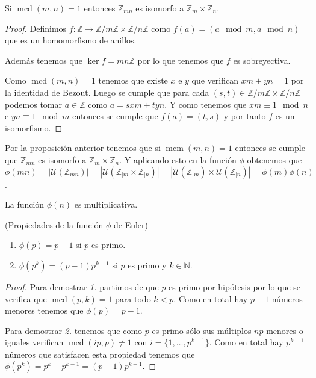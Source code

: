 \begin{proposicion}
		Si $\operatorname{mcd}(m,n)=1$ entonces $\mathbb{Z}_{mn}$ es isomorfo a $\mathbb{Z}_m\times\mathbb{Z}_n$.
\end{proposicion}
\begin{proof}
		Definimos $f:\mathbb{Z}\rightarrow\mathbb{Z}/m\mathbb{Z}\times\mathbb{Z}/n\mathbb{Z}$ como $f(a)=(a\mod m, a\mod n)$ que es un homomorfismo de anillos.

		Además tenemos que $\ker f=mn\mathbb{Z}$ por lo que tenemos que $f$ es sobreyectiva.
		
		Como $\operatorname{mcd}(m,n) = 1$ tenemos que existe $x$ e $y$ que verifican $xm+yn=1$ por la identidad de Bezout. Luego se cumple que para cada $(s,t)\in \mathbb{Z}/m\mathbb{Z}\times\mathbb{Z}/n\mathbb{Z}$ podemos tomar $a \in \mathbb{Z}$ como $a=sxm+tyn$. Y como tenemos que $xm \equiv 1 \mod n$ e $yn \equiv 1 \mod m$ entonces se cumple que $f(a)=(t,s)$ y por tanto $f$ es un isomorfismo.
\end{proof}

Por la proposición anterior tenemos que si $\operatorname{mcm}(m,n)=1$ entonces se cumple que $\mathbb{Z}_{mn}$ es isomorfo a $\mathbb{Z}_m\times\mathbb{Z}_n$. Y aplicando esto en la función $\phi$ obtenemos que $\phi(mn)=|\mathcal{U}(\mathbb{Z}_{mn})|=|\mathcal{U}(\mathbb{Z}_{|m}\times\mathbb{Z}_{|n})|=|\mathcal{U}(\mathbb{Z}_{|m})\times\mathcal{U}(\mathbb{Z}_{|n})|=\phi(m)\phi(n)$.

\begin{corolario}
	La función $\phi(n)$ es multiplicativa.
\end{corolario}

\begin{proposicion}
		(Propiedades de la función $\phi$ de Euler)
		\begin{enumerate}
			\item $\phi(p)=p-1$ si $p$ es primo.
			\item $\phi(p^k)=(p-1)p^{k-1}$ si $p$ es primo y $k\in \mathbb{N}$.
		\end{enumerate}
\end{proposicion}
\begin{proof}
		Para demostrar \emph{1.} partimos de que $p$ es primo por hipótesis por lo que se verifica que $\operatorname{mcd}(p,k)=1$ para todo $k<p$. Como en total hay $p-1$ números menores tenemos que $\phi(p)=p-1$.

		Para demostrar \emph{2.} tenemos que como $p$ es primo sólo sus múltiplos $np$ menores o iguales verifican $\operatorname{mcd}(ip,p)\neq 1$ con $i=\{1,\dots,p^{k-1}\}$. Como en total hay $p^{k-1}$ números que satisfacen esta propiedad tenemos que $\phi(p^k)=p^k-p^{k-1}=(p-1)p^{k-1}$.
\end{proof}

